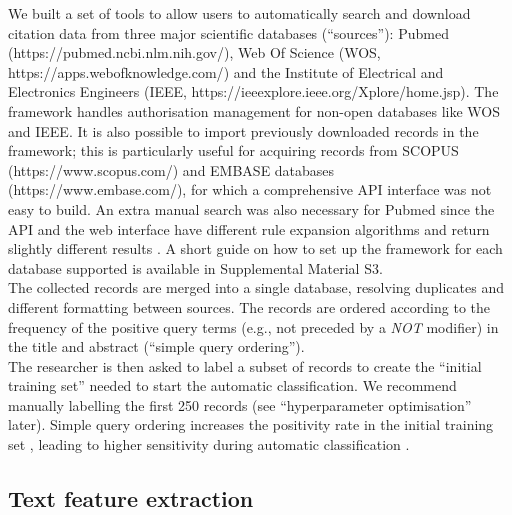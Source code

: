 \documentclass[]{bmcart}
\def\url{} %
\begin{document}
We built a set of tools to allow users to automatically search and
download citation data from three major scientific databases
(``sources''): Pubmed (\url{https://pubmed.ncbi.nlm.nih.gov/}), Web Of
Science (WOS, \url{https://apps.webofknowledge.com/}) and the Institute
of Electrical and Electronics Engineers (IEEE,
\url{https://ieeexplore.ieee.org/Xplore/home.jsp}). The framework
handles authorisation management for non-open databases like WOS and
IEEE. It is also possible to import previously downloaded records in the
framework; this is particularly useful for acquiring records from SCOPUS
(\url{https://www.scopus.com/}) and EMBASE databases
(\url{https://www.embase.com/}), for which a comprehensive API interface
was not easy to build. An extra manual search was also necessary for
Pubmed since the API and the web interface have different rule expansion
algorithms and return slightly different results \citep{pubmedUpdate}. A
short guide on how to set up the framework for each database supported
is available in Supplemental Material S3.\\
The collected records are merged into a single database, resolving
duplicates and different formatting between sources. The records are
ordered according to the frequency of the positive query terms (e.g.,
not preceded by a \emph{NOT} modifier) in the title and abstract
(``simple query ordering'').\\
The researcher is then asked to label a subset of records to create the
``initial training set'' needed to start the automatic classification.
We recommend manually labelling the first 250 records (see
``hyperparameter optimisation'' later). Simple query ordering increases
the positivity rate in the initial training set
\citep{wallace2010active}, leading to higher sensitivity during
automatic classification \citep{chawla2004special}.

\subsection*{Text feature extraction}
\end{document}
